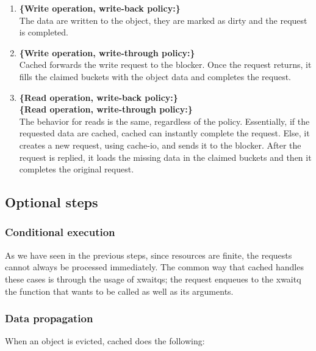 \begin{enumerate}
	\item \textbf{\{Write operation, write-back policy:\}} \hfill \\
		The data are written to the object, they are marked as dirty 
		and the request is completed.
	\item \textbf{\{Write operation, write-through policy:\}} \hfill \\
		Cached forwards the write request to the blocker. Once the 
		request returns, it fills the claimed buckets with the object 
		data and completes the request.
	\item \textbf{\{Read operation, write-back policy:\}} \hfill \\
		\textbf{\{Read operation, write-through policy:\}} \hfill \\
		The behavior for reads is the same, regardless of the policy.
		Essentially, if the requested data are cached, cached can 
		instantly complete the request. Else, it creates a new request, 
		using cache-io, and sends it to the blocker. After the request 
		is replied, it loads the missing data in the claimed buckets 
		and then it completes the original request.
\end{enumerate}

\subsection{Optional steps}

\subsubsection{Conditional execution}

As we have seen in the previous steps, since resources are finite, the requests 
cannot always be processed immediately. The common way that cached handles 
these cases is through the usage of xwaitqs; the request enqueues to the xwaitq 
the function that wants to be called as well as its arguments.

\subsubsection{Data propagation}

When an object is evicted, cached does the following:

